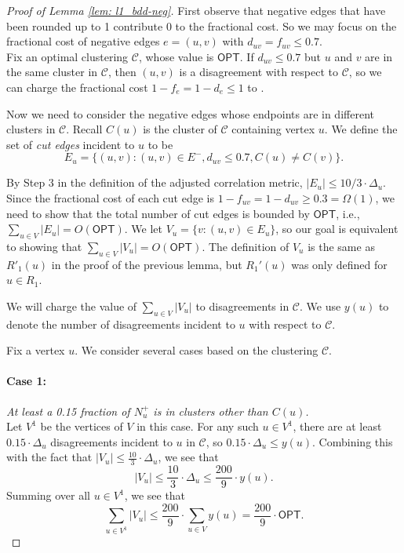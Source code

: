 \begin{proof}[Proof of Lemma \ref{lem: l1_bdd-neg}]
First observe that negative edges that have been rounded up to 1 contribute 0 to the fractional cost. So we may focus on the fractional cost of negative edges $e=(u,v)$ with $d_{uv} = f_{uv} \leq 0.7$. \\


Fix an optimal clustering $\mathcal{C}$, whose value is $\textsf{OPT}$.
If $d_{uv} \leq 0.7$ but $u$ and $v$ are in the same cluster in $\mathcal{C}$,
then $(u,v)$ is a disagreement with respect to $\mathcal{C}$,
so we can charge the fractional cost $1-f_e = 1-d_e \leq 1$ to . 

Now we need to consider the negative edges whose endpoints are in different clusters in $\mathcal{C}$.
Recall $C(u)$ is the cluster of $\mathcal{C}$ containing vertex $u$. 
We define the set of \emph{cut edges} incident to $u$ to be
$$E_u = \{(u,v) : (u,v) \in E^-, d_{uv} \leq 0.7, C(u) \neq C(v) \}.$$ 

By Step 3 in the definition of the adjusted correlation metric, $|E_u| \leq 10/3\cdot\Delta_u$. Since the fractional cost of each cut edge is $1-f_{uv} = 1-d_{uv} \geq 0.3 = \Omega(1)$, we need to show that the total number of cut edges is bounded by $\textsf{OPT}$, i.e.,
$\sum_{u \in V} |E_u| = O(\textsf{OPT}).$
We let $V_u = \{v: (u,v) \in E_u\} $,
so our goal is equivalent to showing that 
$\sum_{u \in V}|V_u| = O(\textsf{OPT}).$
The definition of $V_u$ is the same as $R'_1(u)$ in the proof of the previous lemma, 
but $R_1'(u)$ was only defined for $u \in R_1$.


We will charge the value of $\sum_{u \in V} |V_u|$ to disagreements in $\mathcal{C}$. We use $y(u)$ to denote the number of disagreements incident to $u$ with respect to $\mathcal{C}$. 

Fix a vertex $u$. We consider several cases based on the clustering $\mathcal{C}$. 

\paragraph{Case 1: }\emph{At least a 0.15 fraction of $N_u^+$ is in clusters other than $C(u)$.}  \\
Let $V^1$ be the vertices of $V$ in this case. 
For any such $u \in V^1$, 
there are at least $0.15\cdot \Delta_u$ disagreements incident to $u$ in $\mathcal{C}$, 
so $0.15\cdot \Delta_u\leq y(u).$ 
Combining this with the fact that $|V_u| \leq \frac{10}{3} \cdot \Delta_u $, 
we see that
$$|V_u| \leq \frac{10}{3}\cdot \Delta_u \leq \frac{200}{9} \cdot y(u).$$
Summing over all $u \in V^1$, we see that
$$\boxed{\sum_{u \in V^1} |V_u| \leq \frac{200}{9} \cdot \sum_{u \in V} y(u) = \frac{200}{9} \cdot \textsf{OPT}.}$$


\end{proof}
